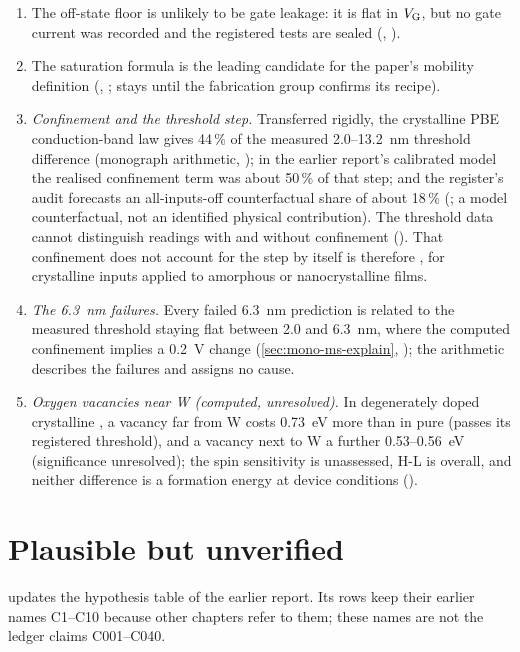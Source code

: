 \begin{enumerate}
\item The off-state floor is unlikely to be gate leakage: it is flat in $V_{\mathrm{G}}$, but no gate current was recorded and the
registered tests are sealed (, ).
\item The saturation formula is the leading candidate for the paper's mobility definition (,
;  stays  until the fabrication group confirms its recipe).
\item \emph{Confinement and the threshold step.} Transferred rigidly, the crystalline PBE conduction-band law gives
44\,\% of the measured 2.0--13.2~nm threshold difference (monograph arithmetic, ); in the earlier report's
calibrated model the realised confinement term was about 50\,\% of that step; and the register's audit forecasts an
all-inputs-off counterfactual share of about 18\,\% (; a model counterfactual, not an identified physical
contribution). The threshold data cannot distinguish readings with and without confinement (). That
confinement does not account for the step by itself is therefore , for crystalline inputs applied to
amorphous or nanocrystalline films.
\item \emph{The 6.3~nm failures.} Every failed 6.3~nm prediction is related to the measured threshold staying flat
between 2.0 and 6.3~nm, where the computed confinement implies a 0.2~V change (\cref{sec:mono-ms-explain},
); the arithmetic describes the failures and assigns no cause.
\item \emph{Oxygen vacancies near W (computed, unresolved).} In degenerately doped crystalline \InO{}, a vacancy far
from W costs 0.73~eV more than in pure \InO{} (passes its registered threshold), and a vacancy next to W a further
0.53--0.56~eV (significance unresolved); the spin sensitivity is unassessed, H-L is  overall, and
neither difference is a formation energy at device conditions ().
\end{enumerate}

\section{Plausible but unverified}
\label{sec:concl-plausible}

 updates the hypothesis table of the earlier report. Its rows keep their earlier names C1--C10
because other chapters refer to them; these names are not the ledger claims C001--C040.

